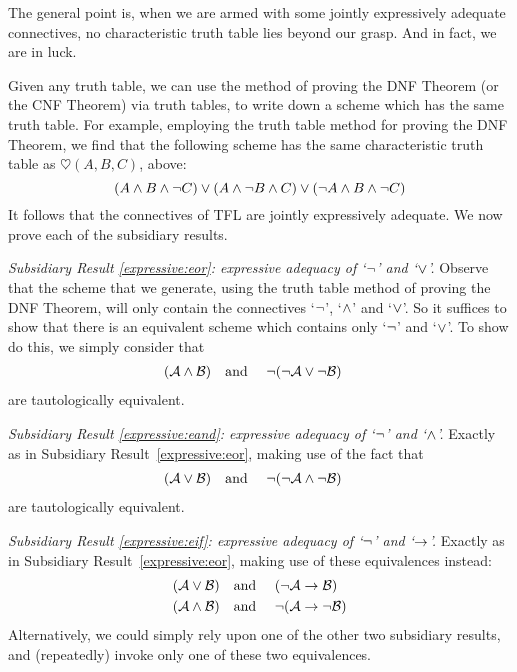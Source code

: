 The general point is, when we are armed with some jointly expressively adequate connectives, no characteristic truth table lies beyond our grasp. And in fact, we are in luck.

Given any truth table, we can use the method of proving the DNF Theorem (or the CNF Theorem) via truth tables, to write down a scheme which has the same truth table. For example, employing the truth table method for proving the DNF Theorem, we find that the following scheme has the same characteristic truth table as $\heartsuit(A,B,C)$, above:
		$$(A \wedge B \wedge \neg C) \vee (A \wedge \neg B \wedge C) \vee (\neg A \wedge B \wedge \neg C)$$			
It follows that the connectives of TFL are jointly expressively adequate. We now prove each of the subsidiary results.
	
\emph{Subsidiary Result \ref{expressive:eor}: expressive adequacy of `$\neg$' and `$\vee$'.} Observe that the scheme that we generate, using the truth table method of proving the DNF Theorem, will only contain the connectives `$\neg$', `$\wedge$' and `$\vee$'. So it suffices to show that there is an equivalent scheme which contains only `$\neg$' and `$\vee$'. To show do this, we simply consider that
		\begin{align*}
		(\mathcal{A} \wedge \mathcal{B}) & \text{\quad and \quad} \neg(\neg \mathcal{A} \vee\neg \mathcal{B})
		\end{align*}
		are tautologically equivalent.

\emph{Subsidiary Result \ref{expressive:eand}: expressive adequacy of `$\neg$' and `$\wedge$'.} Exactly as in Subsidiary Result~\ref{expressive:eor}, making use of the fact that
		\begin{align*}
		(\mathcal{A} \vee \mathcal{B}) & \text{\quad and \quad}\neg(\neg \mathcal{A} \wedge\neg \mathcal{B})
		\end{align*}
are tautologically equivalent.

\emph{Subsidiary Result \ref{expressive:eif}: expressive adequacy of `$\neg$' and `$\rightarrow$'.} Exactly as in Subsidiary Result~\ref{expressive:eor}, making use of these equivalences instead:
		\begin{align*}
		(\mathcal{A} \vee \mathcal{B}) &\text{\quad and \quad} (\neg \mathcal{A} \rightarrow \mathcal{B})\\
		(\mathcal{A} \wedge \mathcal{B}) &\text{\quad and \quad} \neg(\mathcal{A} \rightarrow \neg\mathcal{B})
		\end{align*}
Alternatively, we could simply rely upon one of the other two subsidiary results, and (repeatedly) invoke only one of these two equivalences.

